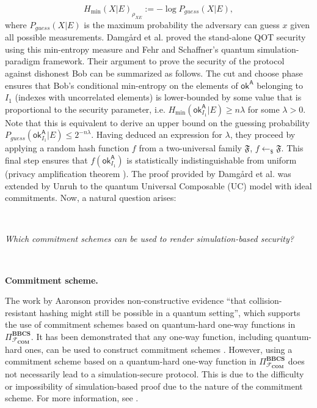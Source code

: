 $$H_{\text{min}}(X | E)_{\rho_{X E}} := -\log P_{guess}(X|E),$$ 
where $P_{guess}(X|E)$ is the maximum probability the adversary can guess $x$ given all possible measurements. Damg{\aa}rd et al. \cite{DFLSS09} proved the stand-alone QOT security using this min-entropy measure and Fehr and Schaffner's \cite{FS09} quantum simulation-paradigm framework. Their argument to prove the security of the protocol against dishonest Bob can be summarized as follows. The cut and choose phase ensures that Bob's conditional min-entropy on the elements of $\mathsf{ok}^{\mathsf{A}}$ belonging to $I_{1}$ (indexes with uncorrelated elements) is lower-bounded by some value that is proportional to the security parameter, i.e. $H_{\text{min}}(\mathsf{ok}^{\mathsf{A}}_{I_{1}} | E) \geq n\lambda$ for some $\lambda > 0$. Note that this is equivalent to derive an upper bound on the guessing probability $P_{guess}(\mathsf{ok}^{\mathsf{A}}_{I_{1}}|E) \leq 2^{-n\lambda}$. Having deduced an expression for $\lambda$, they proceed by applying a random hash function $f$ from a two-universal family $\mathfrak{F}$, $f\leftarrow_{\$}\mathfrak{F}$. This final step ensures that $f(\mathsf{ok}^{\mathsf{A}}_{I_{1}})$ is statistically indistinguishable from uniform (privacy amplification theorem \cite{DFRSS07, RK05, R05}). The proof provided by Damg{\aa}rd et al. \cite{DFLSS09} was extended by Unruh \cite{U10} to the quantum Universal Composable (UC) model with ideal commitments. Now, a natural question arises: 

\

\centerline{\textit{Which commitment schemes can be used to render simulation-based security?}}

\

\noindent\textbf{Commitment scheme.} 

The work by Aaronson \cite{A02} provides non-constructive evidence ``that collision-resistant hashing might still be possible in a quantum setting'', which supports the use of commitment schemes based on quantum-hard one-way functions in $\Pi^{\textbf{BBCS}}_{\mathcal{F}_{\textbf{COM}}}$. It has been demonstrated that any one-way function, including quantum-hard ones, can be used to construct commitment schemes \cite{N91, HILL99, HR07}. However, using a commitment scheme based on a quantum-hard one-way function in $\Pi^{\textbf{BBCS}}_{\mathcal{F}_{\textbf{COM}}}$ does not necessarily lead to a simulation-secure protocol. This is due to the difficulty or impossibility of simulation-based proof due to the nature of the commitment scheme. For more information, see \cite{GLSV21}.

